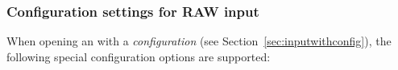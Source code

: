
\begin{comment}
\vspace{.125in}

\noindent\begin{tabular}{p{1.75in}|p{0.5in}|p{3.0in}}
\ImageSpec Attribute & Type & RAW header data or explanation \\
\hline
\qkw{ImageDescription} & string & comment \\
\qkw{oiio:BitsPerSample} & int & the true bits per sample in the RAW file.
\end{tabular}
\end{comment}

\subsubsection*{Configuration settings for RAW input}

When opening an \ImageInput with a \emph{configuration} (see
Section~\ref{sec:inputwithconfig}), the following special configuration
options are supported:

\vspace{.125in}

